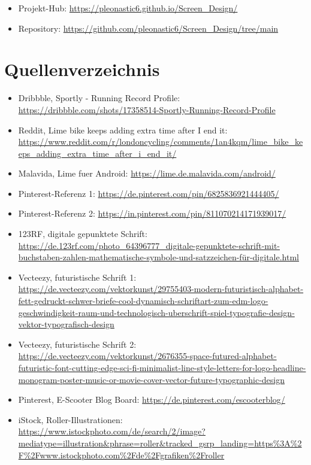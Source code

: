 \documentclass[11pt,a4paper]{article}
\newcommand{\projecthuburl}{https://pleonastic6.github.io/Screen\_Design/}
\newcommand{\repourl}{https://github.com/pleonastic6/Screen\_Design/tree/main}
\begin{document}
\begin{itemize}
  \item Projekt-Hub: \url{\projecthuburl}
  \item Repository: \url{\repourl}
\end{itemize}

\clearpage
\section{Quellenverzeichnis}

\begin{itemize}
  \item Dribbble, \glqq Sportly - Running Record Profile\grqq: \url{https://dribbble.com/shots/17358514-Sportly-Running-Record-Profile}
  \item Reddit, \glqq Lime bike keeps adding extra time after I end it\grqq: \url{https://www.reddit.com/r/londoncycling/comments/1an4kqm/lime_bike_keeps_adding_extra_time_after_i_end_it/}
  \item Malavida, Lime fuer Android: \url{https://lime.de.malavida.com/android/}
  \item Pinterest-Referenz 1: \url{https://de.pinterest.com/pin/6825836921444405/}
  \item Pinterest-Referenz 2: \url{https://in.pinterest.com/pin/811070214171939017/}
  \item 123RF, digitale gepunktete Schrift: \url{https://de.123rf.com/photo_64396777_digitale-gepunktete-schrift-mit-buchstaben-zahlen-mathematische-symbole-und-satzzeichen-für-digitale.html}
  \item Vecteezy, futuristische Schrift 1: \url{https://de.vecteezy.com/vektorkunst/29755403-modern-futuristisch-alphabet-fett-gedruckt-schwer-briefe-cool-dynamisch-schriftart-zum-edm-logo-geschwindigkeit-raum-und-technologisch-uberschrift-spiel-typografie-design-vektor-typografisch-design}
  \item Vecteezy, futuristische Schrift 2: \url{https://de.vecteezy.com/vektorkunst/2676355-space-futured-alphabet-futuristic-font-cutting-edge-sci-fi-minimalist-line-style-letters-for-logo-headline-monogram-poster-music-or-movie-cover-vector-future-typographic-design}
  \item Pinterest, E-Scooter Blog Board: \url{https://de.pinterest.com/escooterblog/}
  \item iStock, Roller-Illustrationen: \url{https://www.istockphoto.com/de/search/2/image?mediatype=illustration&phrase=roller&tracked_gsrp_landing=https%3A%2F%2Fwww.istockphoto.com%2Fde%2Fgrafiken%2Froller}

\end{itemize}
\end{document}

